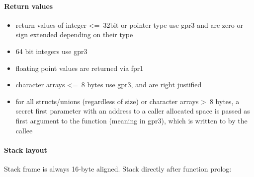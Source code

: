 \paragraph{Return values}

\begin{itemize}
\item return values of integer \textless=\ 32bit or pointer type use gpr3 and are zero or sign extended depending on their type
\item 64 bit integers use gpr3
\item floating point values are returned via fpr1
\item character arrays \textless=\ 8 bytes use gpr3, and are right justified
\item for all structs/unions (regardless of size) or character arrays \textgreater\ 8 bytes, a secret first parameter with an address to a caller allocated space is passed as first argument to the function (meaning in gpr3), which is written to by the callee
\end{itemize}


\paragraph{Stack layout}

Stack frame is always 16-byte aligned.
Stack directly after function prolog:\\

